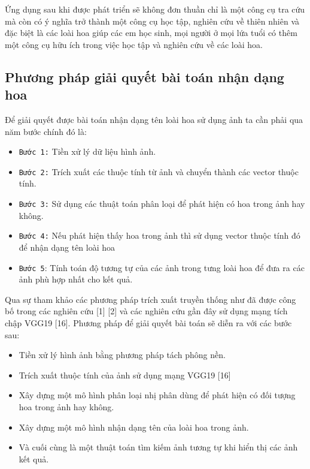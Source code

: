 \documentclass[12pt]{report}
\begin{document}
		Ứng dụng sau khi được phát triển sẽ không đơn thuần chỉ là một công cụ tra cứu mà còn có ý nghĩa trở thành một công cụ học tập, nghiên cứu về thiên nhiên và đặc biệt là các loài hoa giúp các em học sinh, mọi người ở mọi lứa tuổi có thêm một công cụ hữu ích trong việc học tập và nghiên cứu về các loài hoa.
																				
		\subsection{Phương pháp giải quyết bài toán nhận dạng hoa}
																		
		Để giải quyết được bài toán nhận dạng tên loài hoa sử dụng ảnh ta cần phải qua năm bước chính đó là:
																		
		\begin{itemize}
			\item \texttt{Bước 1:} Tiền xử lý dữ liệu hình ảnh.
			\item \texttt{Bước 2:} Trích xuất các thuộc tính từ ảnh và chuyển thành các vector thuộc tính.
			\item \texttt{Bước 3:} Sử dụng các thuật toán phân loại để phát hiện có hoa trong ảnh hay không.
			\item \texttt{Bước 4:}	Nếu phát hiện thấy hoa trong ảnh thì sử dụng vector thuộc tính đó để nhận dạng tên loài hoa
			\item \texttt{Bước 5}: Tính toán độ tương tự của các ảnh trong tưng loài hoa để đưa ra các ảnh phù hợp nhất cho kết quả.
		\end{itemize}
																
		Qua sự tham khảo các phương pháp trích xuất truyền thống như đã được công bố trong các nghiên cứu [1] [2] và các nghiên cứu gần đây sử dụng mạng tích chập VGG19 [16]. Phương pháp để giải quyết bài toán sẽ diễn ra với các bước sau:
																
		\begin{itemize}
			\item Tiền xử lý hình ảnh bằng phương pháp tách phông nền.
			\item Trích xuất thuộc tính của ảnh sử dụng mạng VGG19 [16]
			\item Xây dựng một mô hình phân loại nhị phân dùng để phát hiện có đối tượng hoa trong ảnh hay không.
			\item Xây dựng một mô hình nhận dạng tên của loài hoa trong ảnh.
			\item Và cuối cùng là một thuật toán tìm kiếm ảnh tương tự khi hiển thị các ảnh kết quả.
		\end{itemize}
										
\end{document}
